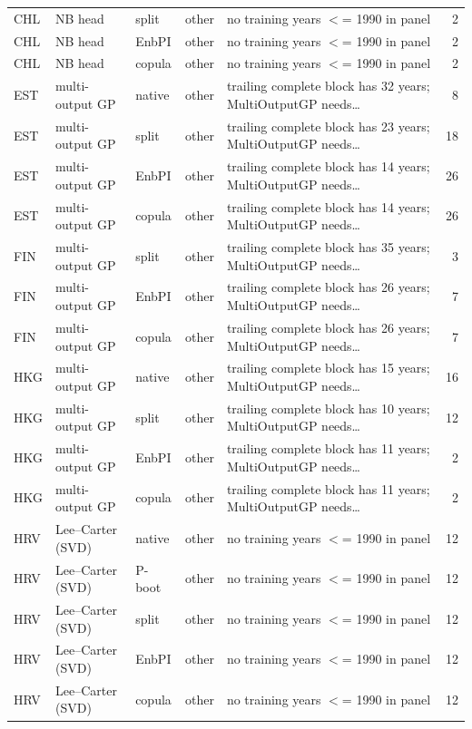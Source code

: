 {\begin{longtable}{@{}lllp{1.6cm}p{6.2cm}r@{}}
CHL & NB head & split & other & no training years $<$= 1990 in panel & 2 \\
CHL & NB head & EnbPI & other & no training years $<$= 1990 in panel & 2 \\
CHL & NB head & copula & other & no training years $<$= 1990 in panel & 2 \\
EST & multi-output GP & native & other & trailing complete block has 32 years; MultiOutputGP needs\ldots & 8 \\
EST & multi-output GP & split & other & trailing complete block has 23 years; MultiOutputGP needs\ldots & 18 \\
EST & multi-output GP & EnbPI & other & trailing complete block has 14 years; MultiOutputGP needs\ldots & 26 \\
EST & multi-output GP & copula & other & trailing complete block has 14 years; MultiOutputGP needs\ldots & 26 \\
FIN & multi-output GP & split & other & trailing complete block has 35 years; MultiOutputGP needs\ldots & 3 \\
FIN & multi-output GP & EnbPI & other & trailing complete block has 26 years; MultiOutputGP needs\ldots & 7 \\
FIN & multi-output GP & copula & other & trailing complete block has 26 years; MultiOutputGP needs\ldots & 7 \\
HKG & multi-output GP & native & other & trailing complete block has 15 years; MultiOutputGP needs\ldots & 16 \\
HKG & multi-output GP & split & other & trailing complete block has 10 years; MultiOutputGP needs\ldots & 12 \\
HKG & multi-output GP & EnbPI & other & trailing complete block has 11 years; MultiOutputGP needs\ldots & 2 \\
HKG & multi-output GP & copula & other & trailing complete block has 11 years; MultiOutputGP needs\ldots & 2 \\
HRV & Lee--Carter (SVD) & native & other & no training years $<$= 1990 in panel & 12 \\
HRV & Lee--Carter (SVD) & P-boot & other & no training years $<$= 1990 in panel & 12 \\
HRV & Lee--Carter (SVD) & split & other & no training years $<$= 1990 in panel & 12 \\
HRV & Lee--Carter (SVD) & EnbPI & other & no training years $<$= 1990 in panel & 12 \\
HRV & Lee--Carter (SVD) & copula & other & no training years $<$= 1990 in panel & 12 \\

\end{longtable}}
